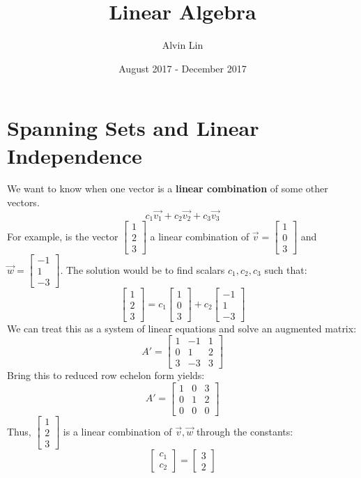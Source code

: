 \documentclass{math}
\title{Linear Algebra}
\author{Alvin Lin}
\date{August 2017 - December 2017}
\begin{document}
\maketitle

\section*{Spanning Sets and Linear Independence}
We want to know when one vector is a \textbf{linear combination} of some other
vectors.
\[ c_1\vec{v_1}+c_2\vec{v_2}+c_3\vec{v_3} \]
For example, is the vector \( \begin{bmatrix}1 \\ 2 \\ 3\end{bmatrix} \) a
linear combination of \( \vec{v} = \begin{bmatrix}1 \\ 0 \\ 3\end{bmatrix} \)
and \( \vec{w} = \begin{bmatrix}-1 \\ 1 \\ -3\end{bmatrix} \). The solution
would be to find scalars \( c_1,c_2,c_3 \) such that:
\[ \begin{bmatrix}1 \\ 2 \\ 3\end{bmatrix} =
  c_1\begin{bmatrix}1 \\ 0 \\ 3\end{bmatrix}+
  c_2\begin{bmatrix}-1 \\ 1 \\ -3\end{bmatrix} \]
We can treat this as a system of linear equations and solve an augmented
matrix:
\[ A' = \left[\begin{array}{cc|c}
  1 & -1 & 1 \\
  0 & 1 & 2 \\
  3 & -3 & 3
\end{array}\right] \]
Bring this to reduced row echelon form yields:
\[ A' = \left[\begin{array}{cc|c}
  1 & 0 & 3 \\
  0 & 1 & 2 \\
  0 & 0 & 0
\end{array}\right] \]
Thus, \( \begin{bmatrix}1 \\ 2 \\ 3\end{bmatrix} \) is a linear combination of
\( \vec{v},\vec{w} \) through the constants:
\[ \begin{bmatrix}c_1 \\ c_2\end{bmatrix} =
  \begin{bmatrix}3 \\ 2\end{bmatrix} \]
\end{document}
